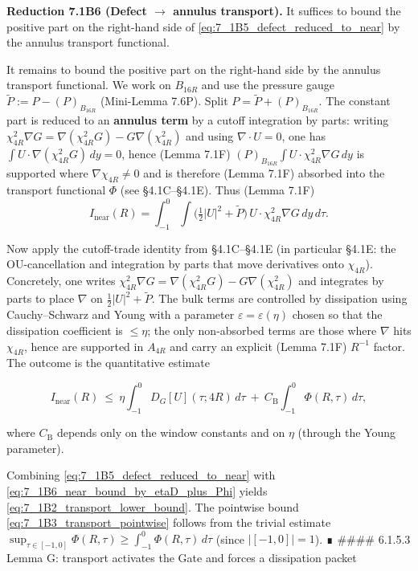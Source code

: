 \documentclass[
  11pt,
]{article}
\begin{document}
\textbf{Reduction 7.1B6 (Defect \(\to\) annulus transport).} It suffices to bound the positive part on the right-hand side of \eqref{eq:7_1B5_defect_reduced_to_near} by the annulus transport functional.

It remains to bound the positive part on the right-hand side by the annulus transport functional. We work on \(B_{16R}\) and use the pressure gauge \(\widetilde P:=P-(P)_{B_{16R}}\) (Mini-Lemma 7.6P). Split \(P=\widetilde P+(P)_{B_{16R}}\). The constant part is reduced to an \textbf{annulus term} by a cutoff integration by parts: writing \(\chi_{4R}^2\nabla G=\nabla(\chi_{4R}^2G)-G\nabla(\chi_{4R}^2)\) and using \(\nabla\cdot U=0\), one has \(\int U\cdot\nabla(\chi_{4R}^2G)\,dy=0\), hence (Lemma 7.1F) \((P)_{B_{16R}}\int U\cdot\chi_{4R}^2\nabla G\,dy\) is supported where \(\nabla\chi_{4R}\neq0\) and is therefore (Lemma 7.1F) absorbed into the transport functional \(\Phi\) (see §4.1C--§4.1E). Thus (Lemma 7.1F) \[
I_{\mathrm{near}}(R)
=\int_{-1}^{0}\!\!\int
\Big(\tfrac12|U|^2+\widetilde P\Big)\,U\cdot\chi_{4R}^2\nabla G\,dy\,d\tau.
\]

Now apply the cutoff-trade identity from §4.1C--§4.1E (in particular §4.1E: the OU-cancellation and integration by parts that move derivatives onto \(\chi_{4R}\)). Concretely, one writes \(\chi_{4R}^2\nabla G=\nabla(\chi_{4R}^2G)-G\nabla(\chi_{4R}^2)\) and integrates by parts to place \(\nabla\) on \(\tfrac12|U|^2+\widetilde P\). The bulk terms are controlled by dissipation using Cauchy--Schwarz and Young with a parameter \(\varepsilon=\varepsilon(\eta)\) chosen so that the dissipation coefficient is \(\le\eta\); the only non-absorbed terms are those where \(\nabla\) hits \(\chi_{4R}\), hence are supported in \(A_{4R}\) and carry an explicit (Lemma 7.1F) \(R^{-1}\) factor. The outcome is the quantitative estimate

\begin{equation}
I_{\mathrm{near}}(R)
\ \le\ \eta\int_{-1}^{0}D_G[U](\tau;4R)\,d\tau
\ +\ C_{\mathrm{B}}\int_{-1}^{0}\Phi(R,\tau)\,d\tau,
\tag{7.1B6}\label{eq:7_1B6_near_bound_by_etaD_plus_Phi}
\end{equation}

where \(C_{\mathrm{B}}\) depends only on the window constants and on \(\eta\) (through the Young parameter).

Combining \eqref{eq:7_1B5_defect_reduced_to_near} with \eqref{eq:7_1B6_near_bound_by_etaD_plus_Phi} yields \eqref{eq:7_1B2_transport_lower_bound}. The pointwise bound \eqref{eq:7_1B3_transport_pointwise} follows from the trivial estimate \(\sup_{\tau\in[-1,0]}\Phi(R,\tau)\ge\int_{-1}^0\Phi(R,\tau)\,d\tau\) (since \(|[-1,0]|=1\)). ∎ \#\#\#\# 6.1.5.3 Lemma G: transport activates the Gate and forces a dissipation packet
\end{document}
